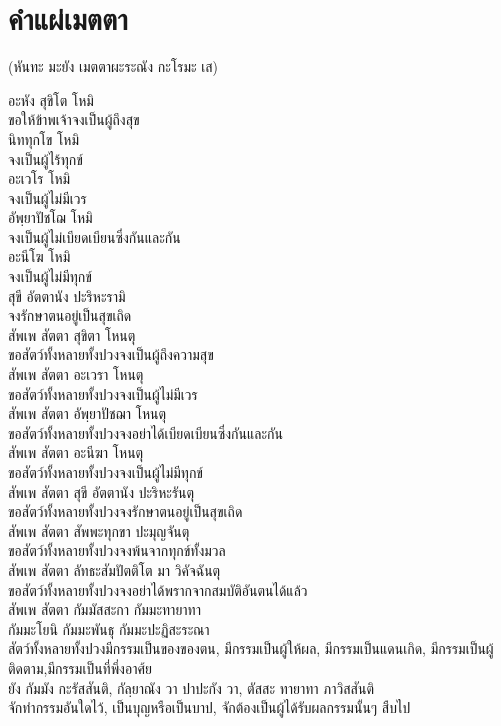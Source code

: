 \documentclass{article}
\begin{document}
\section{คำแผ่เมตตา}
\begin{center}(หันทะ มะยัง เมตตาผะระณัง กะโรมะ เส)\end{center}
อะหัง สุขิโต โหมิ\\
\indent ขอให้ข้าพเจ้าจงเป็นผู้ถึงสุข\\
นิททุกโข โหมิ\\
\indent จงเป็นผู้ไร้ทุกข์\\
อะเวโร โหมิ\\
\indent จงเป็นผู้ไม่มีเวร\\
อัพฺยาปัชโฌ โหมิ \\
\indent จงเป็นผู้ไม่เบียดเบียนซึ่งกันและกัน\\
อะนีโฆ โหมิ\\
\indent จงเป็นผู้ไม่มีทุกข์\\
สุขี อัตตานัง ปะริหะรามิ\\
\indent จงรักษาตนอยู่เป็นสุขเถิด\\
สัพเพ สัตตา สุขิตา โหนตุ\\
\indent ขอสัตว์ทั้งหลายทั้งปวงจงเป็นผู้ถึงความสุข\\
สัพเพ สัตตา อะเวรา โหนตุ\\
\indent ขอสัตว์ทั้งหลายทั้งปวงจงเป็นผู้ไม่มีเวร\\
สัพเพ สัตตา อัพฺยาปัชฌา โหนตุ\\
\indent ขอสัตว์ทั้งหลายทั้งปวงจงอย่าได้เบียดเบียนซึ่งกันและกัน\\
สัพเพ สัตตา อะนีฆา โหนตุ\\
\indent ขอสัตว์ทั้งหลายทั้งปวงจงเป็นผู้ไม่มีทุกข์\\
สัพเพ สัตตา สุขี อัตตานัง ปะริหะรันตุ\\
\indent ขอสัตว์ทั้งหลายทั้งปวงจงรักษาตนอยู่เป็นสุขเถิด\\
สัพเพ สัตตา สัพพะทุกขา ปะมุญจันตุ\\
\indent ขอสัตว์ทั้งหลายทั้งปวงจงพ้นจากทุกข์ทั้งมวล\\
สัพเพ สัตตา ลัทธะสัมปัตติโต มา วิคัจฉันตุ\\
\indent ขอสัตว์ทั้งหลายทั้งปวงจงอย่าได้พรากจากสมบัติอันตนได้แล้ว\\
สัพเพ สัตตา กัมมัสสะกา กัมมะทายาทา\\
กัมมะโยนิ กัมมะพันธุ กัมมะปะฏิสะระณา\\
\indent สัตว์ทั้งหลายทั้งปวงมีกรรมเป็นของของตน, มีกรรมเป็นผู้ให้ผล,
มีกรรมเป็นแดนเกิด, มีกรรมเป็นผู้ติดตาม,มีกรรมเป็นที่พึ่งอาศ้ย\\
ยัง กัมมัง กะรัสสันติ, กัลฺยาณัง วา ปาปะกัง วา, ตัสสะ ทายาทา ภาวิสสันติ\\
\indent จักทำกรรมอันใดไว้, เป็นบุญหรือเป็นบาป, จักต้องเป็นผู้ได้รับผลกรรมนั้นๆ สืบไป
\end{document}
